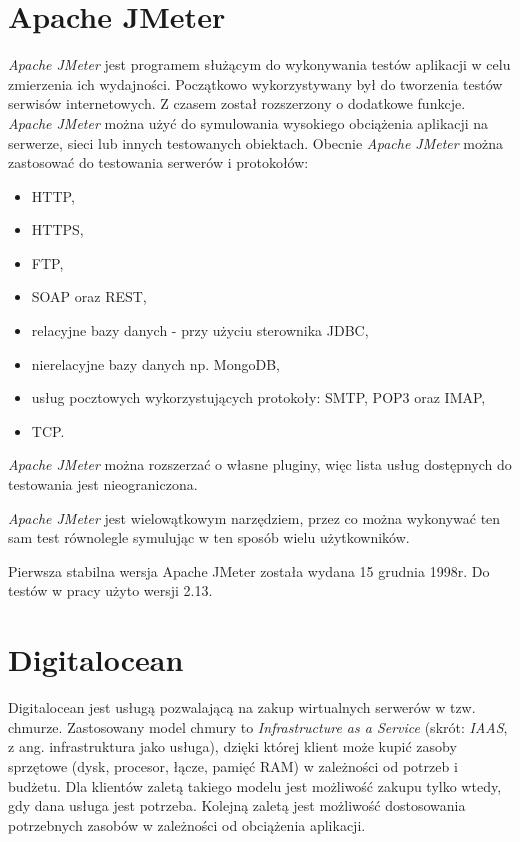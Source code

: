 \section{Apache JMeter}
\textsl{Apache JMeter} \cite{jmeter} jest programem służącym do wykonywania testów aplikacji w celu zmierzenia ich wydajności. Początkowo wykorzystywany był do tworzenia testów serwisów internetowych. Z czasem został rozszerzony o dodatkowe funkcje. \textsl{Apache JMeter} można użyć do symulowania wysokiego obciążenia aplikacji na serwerze, sieci lub innych testowanych obiektach.
Obecnie \textsl{Apache JMeter} można zastosować do testowania serwerów i protokołów:
\begin{itemize}
\item HTTP,
\item HTTPS,
\item FTP,
\item SOAP oraz REST,
\item relacyjne bazy danych - przy użyciu sterownika JDBC,
\item nierelacyjne bazy danych np. MongoDB,
\item usług pocztowych wykorzystujących protokoły: SMTP, POP3 oraz IMAP,
\item TCP.
\end{itemize}
\textsl{Apache JMeter} można rozszerzać o własne pluginy, więc lista usług dostępnych do testowania jest nieograniczona. 

\textsl{Apache JMeter} jest wielowątkowym narzędziem, przez co można  wykonywać ten sam test równolegle symulując w ten sposób wielu użytkowników. 

Pierwsza stabilna wersja Apache JMeter została wydana 15 grudnia 1998r. Do testów w pracy użyto wersji 2.13.

\section{Digitalocean}
Digitalocean \cite{digitalocean} jest usługą pozwalającą na zakup wirtualnych serwerów w tzw. chmurze. Zastosowany model chmury to \textsl{Infrastructure as a Service} (skrót: \textsl{IAAS}, z ang. infrastruktura jako usługa), dzięki której klient może kupić zasoby sprzętowe (dysk, procesor, łącze, pamięć RAM) w zależności od potrzeb i budżetu. Dla klientów zaletą takiego modelu jest możliwość zakupu tylko wtedy, gdy dana usługa jest potrzeba. Kolejną zaletą jest możliwość dostosowania potrzebnych zasobów w zależności od obciążenia aplikacji.

